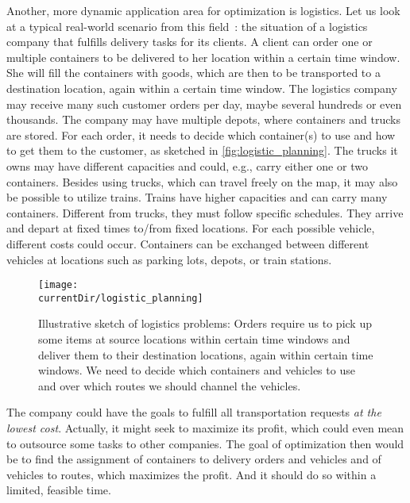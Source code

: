 %
%
\label{sec:intro:logistics}%
%
Another, more dynamic application area for optimization is logistics.
Let us look at a typical real-world scenario from this field~\cite{WPG2009SRWVRPWEA,WPRGG2009EFTP}: the situation of a logistics company that fulfills delivery tasks for its clients.
A client can order one or multiple containers to be delivered to her location within a certain time window.
She will fill the containers with goods, which are then to be transported to a destination location, again within a certain time window.
The logistics company may receive many such customer orders per day, maybe several hundreds or even thousands.
The company may have multiple depots, where containers and trucks are stored.
For each order, it needs to decide which container(s) to use and how to get them to the customer, as sketched in \autoref{fig:logistic_planning}.
The trucks it owns may have different capacities and could, e.g., carry either one or two containers.
Besides using trucks, which can travel freely on the map, it may also be possible to utilize trains.
Trains have higher capacities and can carry many containers.
Different from trucks, they must follow specific schedules.
They arrive and depart at fixed times to/from fixed locations.
For each possible vehicle, different costs could occur.
Containers can be exchanged between different vehicles at locations such as parking lots, depots, or train stations.%
%
\begin{figure}%
\centering%
\texttt{[image: \\currentDir/logistic\_planning]}%
\caption{Illustrative sketch of logistics problems: Orders require us to pick up some items at source locations within certain time windows and deliver them to their destination locations, again within certain time windows. We need to decide which containers and vehicles to use and over which routes we should channel the vehicles.}
\label{fig:logistic_planning}
\end{figure}

The company could have the goals to fulfill all transportation requests \emph{at the lowest cost}.
Actually, it might seek to maximize its profit, which could even mean to outsource some tasks to other companies.
The goal of optimization then would be to find the assignment of containers to delivery orders and vehicles and of vehicles to routes, which maximizes the profit.
And it should do so within a limited, feasible time.

